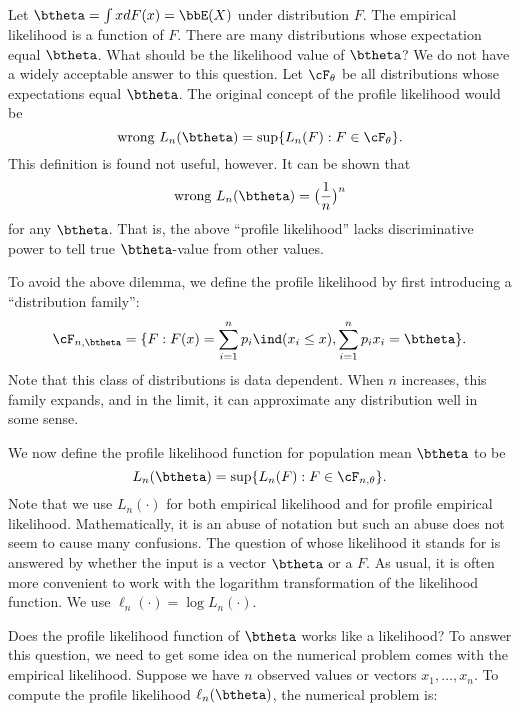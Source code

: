 Let $\btheta = \int x dF(x) = \bbE(X)$ under distribution $F$. The
empirical likelihood is a function of $F$. There are many distributions
whose expectation equal $\btheta$. What should be the likelihood
value of $\btheta$? We do not have a widely acceptable answer to this question. 
Let $\cF_\theta$ be all distributions whose expectations equal $\btheta$.
The original concept of the profile likelihood would be
\[
\mbox{wrong } L_n(\btheta) = \sup \{ L_n(F): F \in \cF_\theta\}.
\]
This definition is found not useful, however. It can be shown that
\[
\mbox{wrong } L_n(\btheta) = \big (\frac{1}{n}\big )^n
\]
for any $\btheta$. That is, the above ``profile likelihood'' lacks discriminative
power to tell true $\btheta$-value from other values.

To avoid the above dilemma, we define the profile likelihood
by first introducing a ``distribution family'':
\[
\cF_{n, \btheta} 
= 
\{F:  F(x) = \sum_{i=1}^n p_i \ind(x_i \leq x), \sum_{i=1}^n p_i x_i = \btheta \}.
\]
Note that this class of distributions is data dependent. When $n$ increases,
this family expands, and in the limit, it can approximate any distribution well
in some sense.

We now define the profile likelihood function for population mean $\btheta$
to be
\[
L_n(\btheta) = \sup \{ L_n(F): F \in \cF_{n, \theta} \}.
\]
Note that we use $L_n(\cdot)$ for both empirical likelihood
and for profile empirical likelihood. Mathematically, it is an abuse
of notation but such an abuse does not seem to cause many confusions.
The question of whose likelihood it stands for 
is answered by whether the input is a vector $\btheta$ or a \cdf $F$. 
As usual, it is often more
convenient to work with the logarithm transformation of the likelihood
function. We use $\ell_n(\cdot) = \log L_n(\cdot)$.

Does the profile likelihood function of $\btheta$ works like a likelihood?
To answer this question, we need to get some idea on the numerical
problem comes with the empirical likelihood.
Suppose we have $n$ observed values or vectors $x_1, \ldots, x_n$. 
To compute the profile likelihood $\ell_n(\btheta)$, the numerical problem is:

